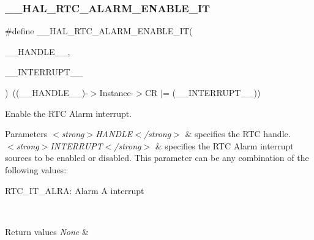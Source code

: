 \subsubsection{\texorpdfstring{\+\_\+\+\_\+\+H\+A\+L\+\_\+\+R\+T\+C\+\_\+\+A\+L\+A\+R\+M\+\_\+\+E\+N\+A\+B\+L\+E\+\_\+\+IT}{\_\_HAL\_RTC\_ALARM\_ENABLE\_IT}}
{\footnotesize\ttfamily \#define \+\_\+\+\_\+\+H\+A\+L\+\_\+\+R\+T\+C\+\_\+\+A\+L\+A\+R\+M\+\_\+\+E\+N\+A\+B\+L\+E\+\_\+\+IT(\begin{DoxyParamCaption}\item[{}]{\+\_\+\+\_\+\+H\+A\+N\+D\+L\+E\+\_\+\+\_\+,  }\item[{}]{\+\_\+\+\_\+\+I\+N\+T\+E\+R\+R\+U\+P\+T\+\_\+\+\_\+ }\end{DoxyParamCaption})~((\+\_\+\+\_\+\+H\+A\+N\+D\+L\+E\+\_\+\+\_\+)-\/$>$Instance-\/$>$CR $\vert$= (\+\_\+\+\_\+\+I\+N\+T\+E\+R\+R\+U\+P\+T\+\_\+\+\_\+))}



Enable the R\+TC Alarm interrupt. 


\begin{DoxyParams}{Parameters}
{\em $<$strong$>$\+H\+A\+N\+D\+L\+E$<$/strong$>$} & specifies the R\+TC handle. \\
\hline
{\em $<$strong$>$\+I\+N\+T\+E\+R\+R\+U\+P\+T$<$/strong$>$} & specifies the R\+TC Alarm interrupt sources to be enabled or disabled. This parameter can be any combination of the following values\+: \begin{DoxyItemize}
\item R\+T\+C\+\_\+\+I\+T\+\_\+\+A\+L\+RA\+: Alarm A interrupt \end{DoxyItemize}
\\
\hline
\end{DoxyParams}

\begin{DoxyRetVals}{Return values}
{\em None} & \\
\hline
\end{DoxyRetVals}
\mbox{\label{group___r_t_c___exported___macros_ga7da963373beb744413c1e3302eb91bae}} 
